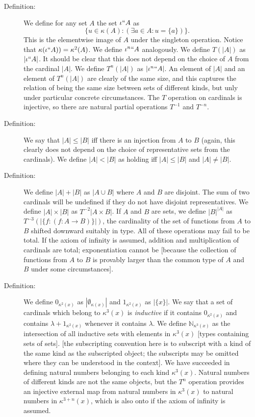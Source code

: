 \documentclass[12pt]{article}
\begin{document}
\begin{description}
\item[Definition:]  We define for any set $A$ the set $\iota``A$ as $$\{u \in \kappa(A):(\exists a \in A:u=\{a\})\}.$$  This is the elementwise image of $A$ under the singleton operation.  Notice that $\kappa(\iota``A)) = \kappa^2(A)$.  We define $\iota^n``A$ analogously.  We define $T(|A|)$ as $|\iota``A|$.  It should be clear that this does not depend on the choice of $A$ from the cardinal $|A|$.  We define $T^n(|A|)$ as $|\iota^n``A|$.  An element of $|A|$ and an element of $T^n(|A|)$ are clearly of the same size, and this captures the relation of being the same size between sets of different kinds, but unly under particular concrete circumstances.  The $T$ operation on cardinals is injective, so there are natural partial operations $T^{-1}$ and $T^{-n}$.

\item[Definition:]  We say that $|A| \leq |B|$ iff there is an injection from $A$ to $B$ (again, this clearly does not depend on the choice of representative sets from the cardinals).  We define $|A| < |B|$ as holding iff $|A| \leq |B|$ and $|A| \neq |B|$.

\item[Definition:]  We define $|A|+|B|$ as $|A \cup B|$ where
$A$ and $B$ are disjoint.  The sum of two cardinals will be undefined if they do not have disjoint representatives.  We define
$|A| \times |B|$ as $T^{-2}|A \times B|$.  If $A$ and $B$ are sets, we define $|B|^{|A|}$ as $T^{-3}(|\{f:(f:A \rightarrow B)\}|)$, the cardinality of the set of functions from $A$ to $B$ shifted downward suitably in type.  All of these operations may fail to be total.  If the axiom of infinity is assumed, addition and multiplication of cardinals are total;  exponentiation cannot be [because the collection of functions from $A$ to $B$ is provably larger than the common type of $A$ and $B$ under some circumstances].

\item[Definition:]  We define $0_{\kappa^2(x)}$ as $|\emptyset_{\kappa(x)}|$ and $1_{\kappa^2(x)}$ as $|\{x\}|$.
We say that a set of cardinals which belong to $\kappa^3(x)$  is {\em inductive\/} if it contains  $0_{\kappa^2(x)}$ and contains
$\lambda + 1_{\kappa^2(x)}$ whenever it contains $\lambda$.
We define $\mathbb N_{\kappa^3(x)}$ as the intersection of all inductive sets with elements in $\kappa^3(x)$ [types containing sets of sets].  [the subscripting convention here is to subscript with a kind of the same kind as the subscripted object;  the subscripts may be omitted where they can be understood in the context].  We  have succeeded in defining natural numbers belonging to each kind $\kappa^3(x)$.  Natural numbers of different kinds are not the same objects, but the $T^n$ operation provides an injective external map from natural numbers in $\kappa^3(x)$ to natural numbers in $\kappa^{3+n}(x)$, which is also onto if the axiom of infinity is assumed.


\end{description}
\end{document}
